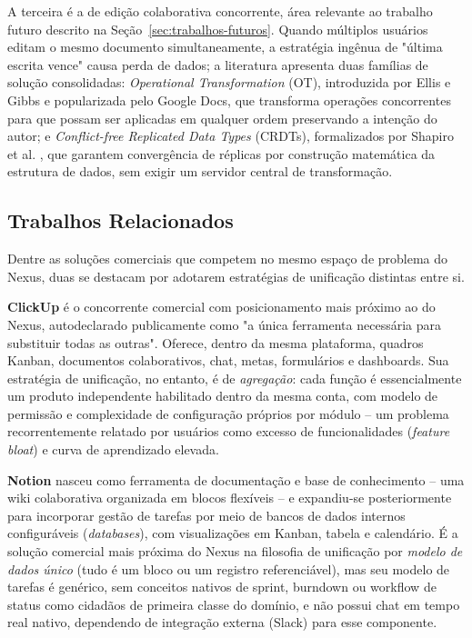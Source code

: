\documentclass[12pt]{article}
\begin{document}
A terceira é a de edição colaborativa concorrente, área relevante ao trabalho futuro descrito na Seção~\ref{sec:trabalhos-futuros}. Quando múltiplos usuários editam o mesmo documento simultaneamente, a estratégia ingênua de "última escrita vence" causa perda de dados; a literatura apresenta duas famílias de solução consolidadas: \emph{Operational Transformation} (OT), introduzida por Ellis e Gibbs \cite{ellis1989concurrency} e popularizada pelo Google Docs, que transforma operações concorrentes para que possam ser aplicadas em qualquer ordem preservando a intenção do autor; e \emph{Conflict-free Replicated Data Types} (CRDTs), formalizados por Shapiro et al. \cite{shapiro2011crdt}, que garantem convergência de réplicas por construção matemática da estrutura de dados, sem exigir um servidor central de transformação.

\subsection{Trabalhos Relacionados}

Dentre as soluções comerciais que competem no mesmo espaço de problema do Nexus, duas se destacam por adotarem estratégias de unificação distintas entre si.

\textbf{ClickUp} \cite{clickup} é o concorrente comercial com posicionamento mais próximo ao do Nexus, autodeclarado publicamente como "a única ferramenta necessária para substituir todas as outras". Oferece, dentro da mesma plataforma, quadros Kanban, documentos colaborativos, chat, metas, formulários e dashboards. Sua estratégia de unificação, no entanto, é de \emph{agregação}: cada função é essencialmente um produto independente habilitado dentro da mesma conta, com modelo de permissão e complexidade de configuração próprios por módulo -- um problema recorrentemente relatado por usuários como excesso de funcionalidades (\emph{feature bloat}) e curva de aprendizado elevada.

\textbf{Notion} \cite{notion} nasceu como ferramenta de documentação e base de conhecimento -- uma wiki colaborativa organizada em blocos flexíveis -- e expandiu-se posteriormente para incorporar gestão de tarefas por meio de bancos de dados internos configuráveis (\emph{databases}), com visualizações em Kanban, tabela e calendário. É a solução comercial mais próxima do Nexus na filosofia de unificação por \emph{modelo de dados único} (tudo é um bloco ou um registro referenciável), mas seu modelo de tarefas é genérico, sem conceitos nativos de sprint, burndown ou workflow de status como cidadãos de primeira classe do domínio, e não possui chat em tempo real nativo, dependendo de integração externa (Slack) para esse componente.
\end{document}
